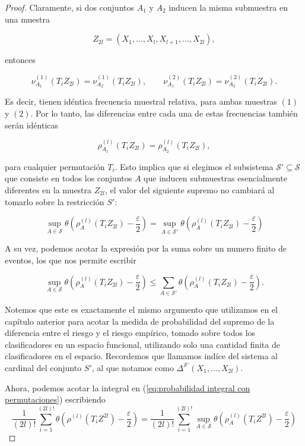 \documentclass{report}
\begin{document}
\begin{proof}
Claramente, si dos conjuntos \( A_1 \) y \( A_2 \) inducen la misma submuestra en una muestra 

\[
Z_{2l} = (X_1, \dots, X_l, X_{l+1}, \dots, X_{2l}),
\]

entonces

\[
\nu^{(1)}_{A_1}(T_i Z_{2l}) = \nu^{(1)}_{A_2}(T_i Z_{2l}), \qquad \nu^{(2)}_{A_1}(T_i Z_{2l}) = \nu^{(2)}_{A_2}(T_i Z_{2l}).
\]

Es decir, tienen idéntica frecuencia muestral relativa, para ambas muestras $(1)$ y $(2)$. Por lo tanto, las diferencias entre cada una de estas frecuencias también serán idénticas

\[
\rho^{(l)}_{A_1}(T_i Z_{2l}) = \rho^{(l)}_{A_2}(T_i Z_{2l}),
\]

para cualquier permutación \( T_i \). Esto implica que si elegimos el subsistema \( \mathcal{S}' \subseteq \mathcal{S} \)
 que consiste en todos los conjuntos \( A \) que inducen submuestras esencialmente diferentes en la muestra \( Z_{2l} \),
el valor del siguiente supremo no cambiará al tomarlo sobre la restricción $S'$:

\[
\sup_{A \in \mathcal{S}} \theta \left( \rho^{(l)}_A(T_i Z_{2l}) - \frac{\varepsilon}{2} \right) = 
\sup_{A \in \mathcal{S}'} \theta \left( \rho^{(l)}_A(T_i Z_{2l}) - \frac{\varepsilon}{2} \right) 
\]

A su vez, podemos acotar la expresión por la suma sobre un numero finito de eventos, los que nos permite escribir

\[
\sup_{A \in \mathcal{S}} \theta \left( \rho^{(l)}_A(T_i Z_{2l}) - \frac{\varepsilon}{2} \right)
\leq \sum_{A \in \mathcal{S}'} \theta \left( \rho^{(l)}_A(T_i Z_{2l}) - \frac{\varepsilon}{2} \right).
\]

Notemos que este es exactamente el mismo argumento que utilizamos en el capítulo anterior para acotar la medida de probabilidad del supremo de la diferencia
entre el riesgo y el riesgo empírico, tomado sobre todos los clasificadores en un espacio funcional, utilizando solo una cantidad finita de clasificadores en el espacio.
Recordemos que llamamos indíce del sistema al cardinal del conjunto $S'$, al que notamos como $ \Delta^{\mathcal{S'}}(X_1, \dots, X_{2l})$.\newline

Ahora, podemos acotar la integral en (\ref{eq:probabilidad integral con permutaciones}) escribiendo
\[
\frac{1}{(2l)!} \sum_{i=1}^{(2l)!} \theta \left(  \rho^{(l)}(T_i Z^{2l}) - \frac{\varepsilon}{2}  \right) 
= \frac{1}{(2l)!} \sum_{i=1}^{(2l)!} \sup_{A \in \mathcal{S}} \theta \left(  \rho^{(l)}_A(T_i Z^{2l}) - \frac{\varepsilon}{2}  \right)
\]


\end{proof}
\end{document}
